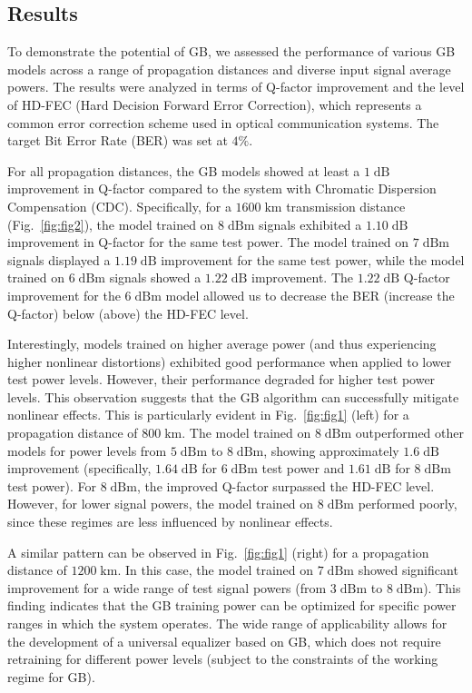 \subsection{Results}
To demonstrate the potential of GB, we assessed the performance of various GB models across a range of propagation distances and diverse input signal average powers. The results were analyzed in terms of Q-factor improvement and the level of HD-FEC (Hard Decision Forward Error Correction), which represents a common error correction scheme used in optical communication systems. The target Bit Error Rate (BER) was set at $4\%$.

For all propagation distances, the GB models showed at least a $1\;\textrm{dB}$ improvement in Q-factor compared to the system with Chromatic Dispersion Compensation (CDC). Specifically, for a $1600\;\textrm{km}$ transmission distance (Fig.~\ref{fig:fig2}), the model trained on $8\;\textrm{dBm}$ signals exhibited a $1.10\;\textrm{dB}$ improvement in Q-factor for the same test power. The model trained on $7\;\textrm{dBm}$ signals displayed a $1.19\;\textrm{dB}$ improvement for the same test power, while the model trained on $6\;\textrm{dBm}$ signals showed a $1.22\;\textrm{dB}$ improvement. The $1.22\;\textrm{dB}$ Q-factor improvement for the $6\;\textrm{dBm}$ model allowed us to decrease the BER (increase the Q-factor) below (above) the HD-FEC level.

Interestingly, models trained on higher average power (and thus experiencing higher nonlinear distortions) exhibited good performance when applied to lower test power levels. However, their performance degraded for higher test power levels. This observation suggests that the GB algorithm can successfully mitigate nonlinear effects. This is particularly evident in Fig.~\ref{fig:fig1} (left) for a propagation distance of $800\;\textrm{km}$. The model trained on $8\;\textrm{dBm}$ outperformed other models for power levels from $5\;\textrm{dBm}$ to $8\;\textrm{dBm}$, showing approximately $1.6\;\textrm{dB}$ improvement (specifically, $1.64\;\textrm{dB}$ for $6\;\textrm{dBm}$ test power and $1.61\;\textrm{dB}$ for $8\;\textrm{dBm}$ test power). For $8\;\textrm{dBm}$, the improved Q-factor surpassed the HD-FEC level. However, for lower signal powers, the model trained on $8\;\textrm{dBm}$ performed poorly, since these regimes are less influenced by nonlinear effects.

A similar pattern can be observed in Fig.~\ref{fig:fig1} (right) for a propagation distance of $1200\;\textrm{km}$. In this case, the model trained on $7\;\textrm{dBm}$ showed significant improvement for a wide range of test signal powers (from $3\;\textrm{dBm}$ to $8\;\textrm{dBm}$). This finding indicates that the GB training power can be optimized for specific power ranges in which the system operates. The wide range of applicability allows for the development of a universal equalizer based on GB, which does not require retraining for different power levels (subject to the constraints of the working regime for GB).


